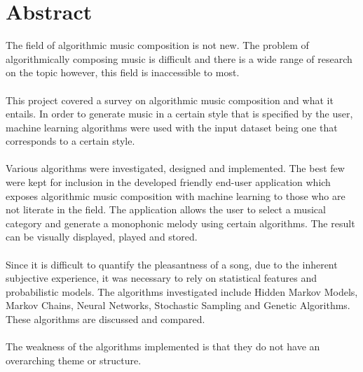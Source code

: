 \begingroup
\let\clearpage\relax
\let\cleardoublepage\relax
\let\cleardoublepage\relax




\chapter*{Abstract}




The field of algorithmic music composition is not new. The problem of algorithmically composing music is difficult and there is a wide range of research on the topic however, this field is inaccessible to most.
\\
\\
This project covered a survey on algorithmic music composition and what it entails. In order to generate music in a certain style that is specified by the user, machine learning algorithms were used with the input dataset being one that corresponds to a certain style.
\\
\\
Various algorithms were investigated, designed and implemented. The best few were kept for inclusion in the developed friendly end-user application which exposes algorithmic music composition with machine learning to those who are not literate in the field. The application allows the user to select a musical category and generate a monophonic melody using certain algorithms. The result can be visually displayed, played and stored.
\\
\\
Since it is difficult to quantify the pleasantness of a song, due to the inherent subjective experience, it was necessary to rely on statistical features and probabilistic models. The algorithms investigated include Hidden Markov Models, Markov Chains, Neural Networks, Stochastic Sampling and Genetic Algorithms. These algorithms are discussed and compared.
\\
\\
The weakness of the algorithms implemented is that they do not have an overarching theme or structure. 



\vfill



\endgroup			

\vfill